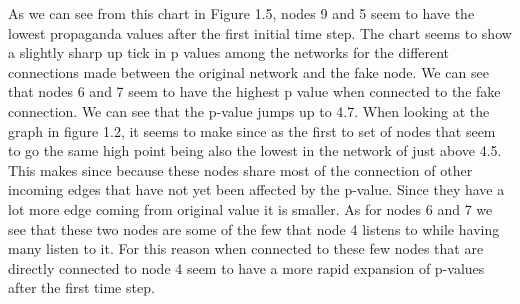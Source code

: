 \documentclass[letterpaper]{article}
\begin{document}
As we can see from this chart in Figure 1.5, nodes 9 and 5 seem to have the lowest propaganda values after the first initial time step.  The chart seems to show a slightly sharp up tick in p values among the networks for the different connections made between the original network and the fake node.  We can see that nodes 6 and 7 seem to have the highest p value when connected to the fake connection.  We can see that the p-value jumps up to 4.7.  When looking at the graph in figure 1.2, it seems to make since as the first to set of nodes that seem to go the same high point being also the lowest in the network of just above 4.5.  This makes since because these nodes share most of the connection of other incoming edges that have not yet been affected by the p-value.  Since they have a lot more edge coming from original value it is smaller.  As for nodes 6 and 7 we see that these two nodes are some of the few that node 4 listens to while having many listen to it.  For this reason when connected to these few nodes that are directly connected to node 4 seem to have a more rapid expansion of p-values after the first time step.  

\end{document}
